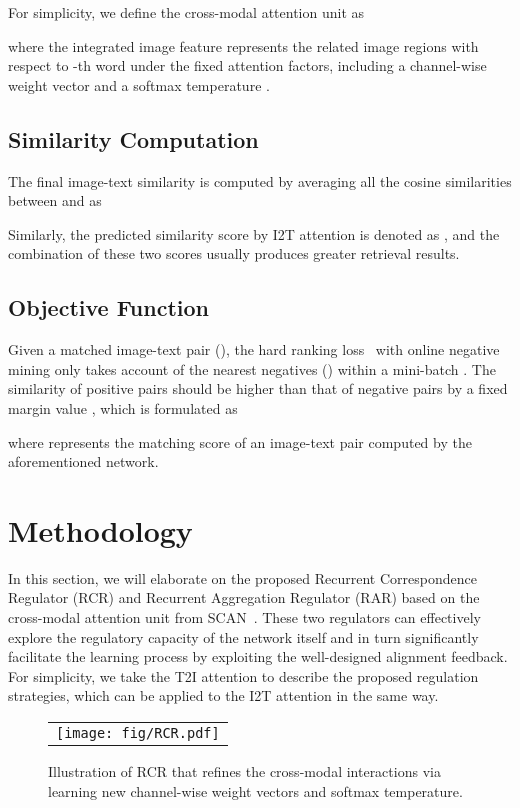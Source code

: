 \documentclass[journal]{IEEEtran}\newcommand{\ignore}[1]{}
\begin{document}
For simplicity, we define the cross-modal attention unit as

where the integrated image feature  represents the related image regions with respect to -th word under the fixed attention factors, including a channel-wise weight vector  and a softmax temperature .


\subsection{Similarity Computation}
The final image-text similarity is computed by averaging all the cosine similarities between  and  as
 
Similarly, the predicted similarity score by I2T attention is denoted as , and the combination of these two scores usually produces greater retrieval results. 

\subsection{Objective Function}
Given a matched image-text pair (), the hard ranking loss~\cite{VSE++} with online negative mining only takes account of the nearest negatives () within a mini-batch . The similarity of positive pairs should be higher than that of negative pairs by a fixed margin value , which is formulated as

where  represents the matching score of an image-text pair computed by the aforementioned network. 


\section{Methodology}
In this section, we will elaborate on the proposed Recurrent Correspondence Regulator (RCR) and Recurrent Aggregation Regulator (RAR) based on the cross-modal attention unit from SCAN~\cite{SCAN}. 
These two regulators can effectively explore the regulatory capacity of the network itself and in turn significantly facilitate the learning process by exploiting the well-designed alignment feedback. 
For simplicity, we take the T2I attention to describe the proposed regulation strategies, which can be applied to the I2T attention in the same way.

\begin{figure}[t!]
	\centering
	\begin{tabular}{@{}c}
		\texttt{[image: fig/RCR.pdf]}
	\end{tabular}
	\caption{Illustration of RCR that refines the cross-modal interactions via learning new channel-wise weight vectors and softmax temperature.}
	\label{fig:RCR}
\end{figure}
\end{document}
